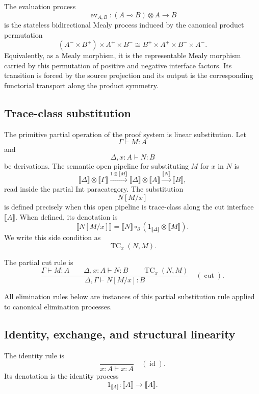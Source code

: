 The evaluation process
\[
\operatorname{ev}_{A,B}:
(A\multimap B)\otimes A\to B
\]
is the stateless bidirectional Mealy process induced by the canonical product
permutation
\[
(A^-\times B^+)\times A^+\times B^-
\cong
B^+\times A^+\times B^-\times A^-.
\]
Equivalently, as a Mealy morphism, it is the representable Mealy morphism
carried by this permutation of positive and negative interface factors.  Its
transition is forced by the source projection and its output is the
corresponding functorial transport along the product symmetry.

\subsection{Trace-class substitution}

The primitive partial operation of the proof system is linear substitution.
Let
\[
\Gamma\vdash M:A
\]
and
\[
\Delta,x:A\vdash N:B
\]
be derivations.  The semantic open pipeline for substituting \(M\) for \(x\)
in \(N\) is
\[
\llbracket \Delta\rrbracket\otimes\llbracket \Gamma\rrbracket
\xrightarrow{1\otimes \llbracket M\rrbracket}
\llbracket \Delta\rrbracket\otimes\llbracket A\rrbracket
\xrightarrow{\llbracket N\rrbracket}
\llbracket B\rrbracket,
\]
read inside the partial Int paracategory.  The substitution
\[
N[M/x]
\]
is defined precisely when this open pipeline is trace-class along the cut
interface \(\llbracket A\rrbracket\).  When defined, its denotation is
\[
\llbracket N[M/x]\rrbracket
=
\llbracket N\rrbracket\circ_{\partial}
(1_{\llbracket\Delta\rrbracket}\otimes \llbracket M\rrbracket).
\]
We write this side condition as
\[
\operatorname{TC}_x(N,M).
\]

\begin{definition}
\label{def:natural-deduction-partial-cut}
The partial cut rule is
\[
\frac{
  \Gamma\vdash M:A
  \qquad
  \Delta,x:A\vdash N:B
  \qquad
  \operatorname{TC}_x(N,M)
}{
  \Delta,\Gamma\vdash N[M/x]:B
}
\quad(\operatorname{cut}).
\]
\end{definition}

All elimination rules below are instances of this partial substitution rule
applied to canonical elimination processes.

\subsection{Identity, exchange, and structural linearity}

The identity rule is
\[
\frac{}{x:A\vdash x:A}
\quad(\operatorname{id}).
\]
Its denotation is the identity process
\[
1_{\llbracket A\rrbracket}:
\llbracket A\rrbracket\to\llbracket A\rrbracket.
\]

